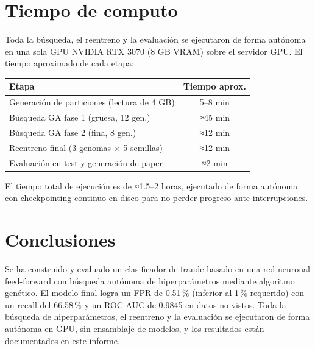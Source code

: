 \documentclass[11pt,a4paper]{article}
\begin{document}
\section{Tiempo de computo}
Toda la búsqueda, el reentreno y la evaluación se ejecutaron de forma autónoma en una sola GPU NVIDIA RTX 3070 (8 GB VRAM) sobre el servidor GPU. El tiempo aproximado de cada etapa:

\begin{center}
\begin{tabular}{lc}
\toprule
Etapa & Tiempo aprox. \\
\midrule
Generación de particiones (lectura de 4 GB) & 5--8 min \\
Búsqueda GA fase 1 (gruesa, 12 gen.) & ≈45 min \\
Búsqueda GA fase 2 (fina, 8 gen.) & ≈12 min \\
Reentreno final (3 genomas $\times$ 5 semillas) & ≈12 min \\
Evaluación en test y generación de paper & ≈2 min \\
\bottomrule
\end{tabular}
\end{center}

El tiempo total de ejecución es de ≈1.5--2 horas, ejecutado de forma autónoma con checkpointing continuo en disco para no perder progreso ante interrupciones.

\section{Conclusiones}
Se ha construido y evaluado un clasificador de fraude basado en una red neuronal feed-forward con búsqueda autónoma de hiperparámetros mediante algoritmo genético. El modelo final logra un FPR de 0.51\,\% (inferior al 1\,\% requerido) con un recall del 66.58\,\% y un ROC-AUC de 0.9845 en datos no vistos. Toda la búsqueda de hiperparámetros, el reentreno y la evaluación se ejecutaron de forma autónoma en GPU, sin ensamblaje de modelos, y los resultados están documentados en este informe.
\end{document}

